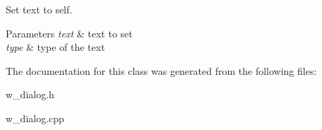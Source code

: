 Set text to self. 


\begin{DoxyParams}{Parameters}
{\em text} & text to set \\
\hline
{\em type} & type of the text \\
\hline
\end{DoxyParams}


The documentation for this class was generated from the following files\+:\begin{DoxyCompactItemize}
\item 
w\+\_\+dialog.\+h\item 
w\+\_\+dialog.\+cpp\end{DoxyCompactItemize}
